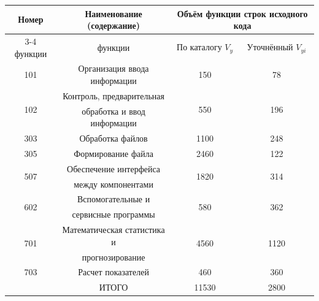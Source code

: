 {{\begin{Center}
        \renewcommand{\arraystretch}{1.4} %
        \begin{tabular}{|c|c|c|c|}
        \hline
        Номер                & Наименование (содержание)            & \multicolumn{2}{c|}{Объём функции строк исходного кода} \\ \cline{3-4}
        функции              & функции                              & По каталогу $V_y$     & Уточнённый $V_{yi}$             \\ \hline
        101                  & Организация ввода информации         & 150                   & 78                              \\ \hline
        \multirow{2}{*}{102} & Контроль, предварительная            & \multirow{2}{*}{550}  & \multirow{2}{*}{196}            \\
                             & обработка и ввод информации          &                       &                                 \\ \hline
        303                  & Обработка файлов                     & 1100                  & 248                             \\ \hline
        305                  & Формирование файла                   & 2460                  & 122                             \\ \hline
        \multirow{2}{*}{507} & Обеспечение интерфейса               & \multirow{2}{*}{1820} & \multirow{2}{*}{314}            \\
                             & между компонентами                   &                       &                                 \\ \hline
        \multirow{2}{*}{602} & Вспомогательные и                    & \multirow{2}{*}{580}  & \multirow{2}{*}{362}            \\ 
                             & сервисные программы                  &                       &                                 \\ \hline
        \multirow{2}{*}{701} & Математическая статистика и          & \multirow{2}{*}{4560} & \multirow{2}{*}{1120}           \\ 
                             & прогнозирование                      &                       &                                 \\ \hline
        703                  & Расчет показателей                   & 460                   & 360                             \\ \hline
                             & ИТОГО                                & 11530                 & 2800                            \\ \hline
        \end{tabular}
    \end{Center}}
    \botTablespace \addtocounter{tablecntr}{1}

}
